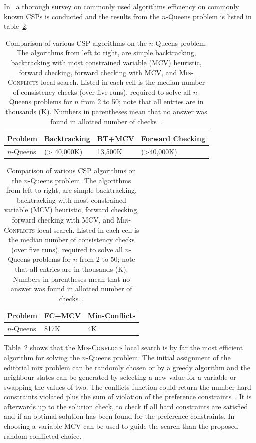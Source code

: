 In~\cite[p. 143]{AIRussell} a thorough survey on commonly used algorithms efficiency on commonly known CSPs is conducted and the results from the $n$-Queens problem is listed in table~\ref{tab:nQueen}.
\begin{table}[ht!p]
\footnotesize
\caption{Comparison of various CSP algorithms on the $n$-Queens problem. The algorithms from left to right, are simple backtracking, backtracking with most constrained variable (MCV) heuristic, forward checking, forward checking with MCV, and \textsc{Min-Conflicts} local search. Listed in each cell is the median number of consistency checks (over five runs), required to solve all $n$-Queens problems for $n$ from 2 to 50; note that all entries are in thousands (K).  Numbers in parentheses mean that no answer was found in allotted number of checks~\protect\cite[p. 143]{AIRussell}.}
\label{tab:nQueen}
	\begin{tabular}{|l|l|l|l|}
		\hline
		Problem& Backtracking& BT+MCV& Forward Checking\\
		\hline
		$n$-Queens& (> 40,000K)& 13,500K& (>40,000K)\\
		\hline
	\end{tabular}
	
	\begin{minipage}{\textwidth}
	\vspace{10pt}
		\begin{tabular}{|l|l|l|}
			\hline
			Problem& FC+MCV& Min-Conflicts\\
			\hline
			$n$-Queens& 817K& 4K\\
			\hline
		\end{tabular}
	\end{minipage}

\end{table}

Table~\ref{tab:nQueen} shows that the \textsc{Min-Conflicts} local search is by far the most efficient algorithm for solving the $n$-Queens problem. The initial assignment of the editorial mix problem can be randomly chosen or by a greedy algorithm and the neighbour states can be generated by selecting a new value for a variable or swapping the values of two. The conflicts function could return the number hard constraints violated plus the sum of violation of the preference constraints~\cite[pp. 372]{CPApt}\cite[p. 150]{AIRussell}. It is afterwards up to the solution check, to check if all hard constraints are satisfied and if an optimal solution has been found for the preference constraints. In choosing a variable MCV can be used to guide the search than the proposed random conflicted choice.

